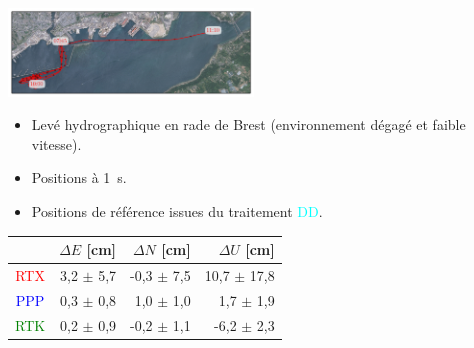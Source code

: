 \documentclass[portrait,final,a0paper,fontscale=0.3]{baposter}
\begin{document}
\begin{poster}
{	\begin{minipage}{0.55\textwidth}
		\includegraphics[width=6.5cm]{figures/4_map_survey.jpg}
	\end{minipage}
	\begin{minipage}{0.44\textwidth}
		\begin{itemize}
			\item Levé hydrographique en rade de Brest (environnement dégagé et faible vitesse).
			\item Positions à 1~s.
			\item Positions de référence issues du traitement \textcolor{cyan}{DD}.
		\end{itemize}
	\end{minipage}
	
	\medskip
	\begin{minipage}[c]{0.52\textwidth}
		\centering
		\small
		\begin{tabular}{crrr}
			\hline
			 & $\Delta E$ [cm] & $\Delta N$ [cm]& $\Delta U$ [cm]\\
			\hline
			\textcolor{red}{RTX}   &  3,2 $\pm$ 5,7 & -0,3 $\pm$ 7,5 & 10,7 $\pm$ 17,8\\
			\textcolor{blue}{PPP}  &  0,3 $\pm$ 0,8 &  1,0 $\pm$ 1,0 &  1,7 $\pm$  1,9\\
			\textcolor{green}{RTK} &  0,2 $\pm$ 0,9 & -0,2 $\pm$ 1,1 & -6,2 $\pm$ 2,3\\
			\hline
		\end{tabular}
		

\end{minipage}}
\end{poster}
\end{document}
